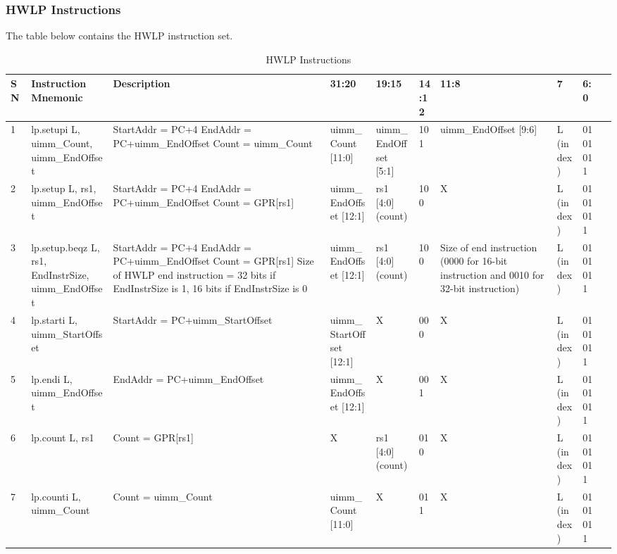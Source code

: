 \documentclass[main\_\_EN.tex]{subfiles}
\begin{document}
\clearpage
\begin{landscape}

\subsubsection{HWLP Instructions}
\label{sec:riscvcpu-hwloop-instr}
The table below contains the HWLP instruction set.

\begin{table}[H]
    \caption{HWLP Instructions}
    \label{tab:riscvcpu-hwlp-instr}
    \begin{tabular}{|p{0.3cm}|p{2.5cm}|p{6cm}|p{2.5cm}|p{2.5cm}|p{1cm}|p{2.5cm}|p{2cm}|p{2cm}|p{2cm}|}
        \hline\rowcolor{lightgray}
        \textbf{SN} & \textbf{Instruction Mnemonic} & \textbf{Description} & \textbf{31:20} & \textbf{19:15} & \textbf{14:12}  & \textbf{11:8} & \textbf{7} & \textbf{6:0} \\
        \hline
        1 & lp.setupi L, uimm\_Count, uimm\_EndOffset & StartAddr = PC+4 \newline EndAddr = PC+uimm\_EndOffset \newline Count = uimm\_Count & uimm\_Count [11:0] & uimm\_EndOffset [5:1] &  101 & uimm\_EndOffset [9:6] & L (index) & 0101011\\
        \hline
        2 & lp.setup L, rs1, uimm\_EndOffset & StartAddr = PC+4 \newline EndAddr = PC+uimm\_EndOffset \newline Count = GPR[rs1] & uimm\_EndOffset [12:1]  & rs1 [4:0] (count) & 100 & X & L (index) & 0101011 \\
        \hline
        3 & lp.setup.beqz L, rs1, EndInstrSize, uimm\_EndOffset & StartAddr = PC+4 \newline EndAddr = PC+uimm\_EndOffset \newline Count = GPR[rs1] \newline Size of HWLP end instruction = 32 bits if EndInstrSize is 1, 16 bits if EndInstrSize is 0& uimm\_EndOffset [12:1]  & rs1 [4:0] (count) & 100 & Size of end instruction (0000 for 16-bit instruction and 0010 for 32-bit instruction) & L (index) & 0101011 \\
        \hline
        4 & lp.starti L, uimm\_StartOffset & StartAddr = PC+uimm\_StartOffset  & uimm\_StartOffset [12:1] & X & 000 & X & L (index) & 0101011 \\
        \hline
        5 & lp.endi L, uimm\_EndOffset & EndAddr = PC+uimm\_EndOffset & uimm\_EndOffset [12:1] & X & 001 & X & L (index) & 0101011\\
        \hline
        6 & lp.count L, rs1 & Count = GPR[rs1] & X & rs1 [4:0] (count) & 010 & X & L (index) & 0101011\\
        \hline
        7 & lp.counti L, uimm\_Count & Count = uimm\_Count & uimm\_Count [11:0] & X & 011 & X & L (index) & 0101011\\
        \hline
    \end{tabular}
\end{table}

\end{landscape}
\restoregeometry
\clearpage
\end{document}
